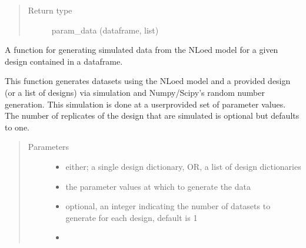 \documentclass[letterpaper,10pt,english,openany,oneside]{sphinxmanual}
\begin{document}
\begin{fulllineitems}
\begin{fulllineitems}
\begin{quote}
\begin{description}
\begin{description}
\end{description}


\item[{Return type}] \leavevmode
param\_data (dataframe, list)

\end{description}\end{quote}

\end{fulllineitems}


\begin{fulllineitems}
\label{\detokenize{nloed:nloed.model.Model.sample}}
A function for generating simulated data from the NLoed model for a given design contained in a dataframe.

This function generates datasets using the NLoed model and a provided design (or a list of
designs) via simulation and Numpy/Scipy’s random number generation. This simulation is done
at a user\sphinxhyphen{}provided set of parameter values. The number of replicates of the design that are
simulated is optional but defaults to one.
\begin{quote}\begin{description}
\item[{Parameters}] \leavevmode\begin{itemize}
\item {} 
 \textendash{} either; a single design dictionary, OR, a list of design dictionaries

\item {} 
 \textendash{} the parameter values at which to generate the data

\item {} 
 \textendash{} optional,  an integer indicating the number of datasets to generate for each design,  default is 1

\item {} 
 \textendash{} 


\end{itemize}
\end{description}
\end{quote}
\end{fulllineitems}
\end{fulllineitems}
\end{document}
